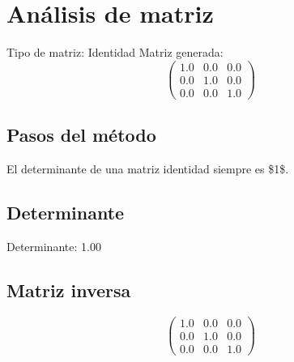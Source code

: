 \documentclass{article}%
\begin{document}
%
\normalsize%
\section{Análisis de matriz}%
\label{sec:Anlisisdematriz}%
Tipo de matriz: Identidad%
\newline%
Matriz generada:%
\[%
\begin{pmatrix}%
1.0&0.0&0.0\\%
0.0&1.0&0.0\\%
0.0&0.0&1.0%
\end{pmatrix}%
\]%
\newline%
\subsection{Pasos del método}%
\label{subsec:Pasosdelmtodo}%
El determinante de una matriz identidad siempre es \$1\$.\newline%

%
\subsection{Determinante}%
\label{subsec:Determinante}%
Determinante: 1.00

%
\subsection{Matriz inversa}%
\label{subsec:Matrizinversa}%
\[%
\begin{pmatrix}%
1.0&0.0&0.0\\%
0.0&1.0&0.0\\%
0.0&0.0&1.0%
\end{pmatrix}%
\]

%
\end{document}
